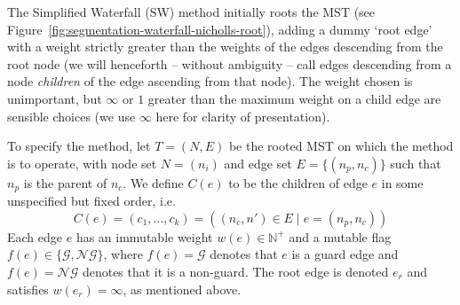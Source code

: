 \documentclass[preprint,a4paper]{elsarticle}
\begin{document}
The Simplified Waterfall (SW) method initially roots the MST (see Figure~\ref{fig:segmentation-waterfall-nicholls-root}), adding a dummy `root edge' with a weight strictly greater than the weights of the edges descending from the root node (we will henceforth -- without ambiguity -- call edges descending from a node \emph{children} of the edge ascending from that node). The weight chosen is unimportant, but $\infty$ or $1$ greater than the maximum weight on a child edge are sensible choices (we use $\infty$ here for clarity of presentation).

To specify the method, let $T = (N,E)$ be the rooted MST on which the method is to operate, with node set $N = (n_i)$ and edge set $E = \{(n_p,n_c)\}$ such that $n_p$ is the parent of $n_c$. We define $C(e)$ to be the children of edge $e$ in some unspecified but fixed order, i.e.
%
\[
C(e) = (c_1,...,c_k) = ((n_c,n') \in E \; | \; e = (n_p,n_c))
\]
%
Each edge $e$ has an immutable weight $w(e) \in \mathbb{N}^+$ and a mutable flag $f(e) \in \{\mathcal{G},\mathcal{NG}\}$, where $f(e) = \mathcal{G}$ denotes that $e$ is a guard edge and $f(e) = \mathcal{NG}$ denotes that it is a non-guard. The root edge is denoted $e_r$ and satisfies $w(e_r) = \infty$, as mentioned above.
\end{document}
